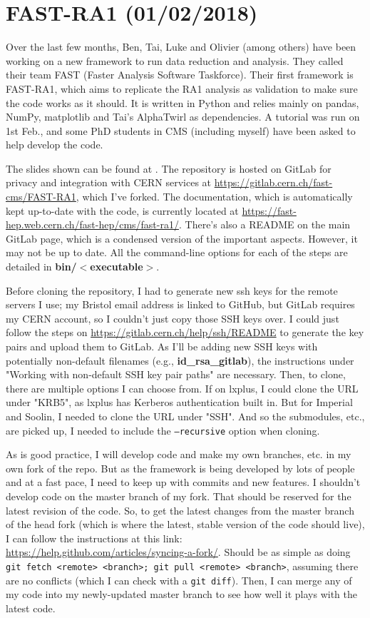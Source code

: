 \newpage
\chapter{FAST-RA1 (01/02/2018)}
\label{sec:fast-ra1}

Over the last few months, Ben, Tai, Luke and Olivier (among others) have been working on a new framework to run data reduction and analysis. They called their team FAST (Faster Analysis Software Taskforce). Their first framework is FAST-RA1, which aims to replicate the RA1 analysis as validation to make sure the code works as it should. It is written in Python and relies mainly on pandas, NumPy, matplotlib and Tai's AlphaTwirl as dependencies. A tutorial was run on 1st Feb., and some PhD students in CMS (including myself) have been asked to help develop the code.

The slides shown can be found at %
. The repository is hosted on GitLab for privacy and integration with CERN services at \url{https://gitlab.cern.ch/fast-cms/FAST-RA1}, which I've forked. The documentation, which is automatically kept up-to-date with the code, is currently located at \url{https://fast-hep.web.cern.ch/fast-hep/cms/fast-ra1/}. There's also a README on the main GitLab page, which is a condensed version of the important aspects. However, it may not be up to date. All the command-line options for each of the steps are detailed in \textbf{bin/$<$executable$>$}. 

Before cloning the repository, I had to generate new ssh keys for the remote servers I use; my Bristol email address is linked to GitHub, but GitLab requires my CERN account, so I couldn't just copy those SSH keys over. I could just follow the steps on \url{https://gitlab.cern.ch/help/ssh/README} to generate the key pairs and upload them to GitLab. As I'll be adding new SSH keys with potentially non-default filenames (e.g., \textbf{id\_rsa\_gitlab}), the instructions under "Working with non-default SSH key pair paths" are necessary. Then, to clone, there are multiple options I can choose from. If on lxplus, I could clone the URL under "KRB5", as lxplus has Kerberos authentication built in. But for Imperial and Soolin, I needed to clone the URL under "SSH". And so the submodules, etc., are picked up, I needed to include the \texttt{--recursive} option when cloning.

As is good practice, I will develop code and make my own branches, etc. in my own fork of the repo. But as the framework is being developed by lots of people and at a fast pace, I need to keep up with commits and new features. I shouldn't develop code on the master branch of my fork. That should be reserved for the latest revision of the code. So, to get the latest changes from the master branch of the head fork (which is where the latest, stable version of the code should live), I can follow the instructions at this link: \url{https://help.github.com/articles/syncing-a-fork/}. Should be as simple as doing \texttt{git fetch <remote> <branch>; git pull <remote> <branch>}, assuming there are no conflicts (which I can check with a \texttt{git diff}). Then, I can merge any of my code into my newly-updated master branch to see how well it plays with the latest code.


